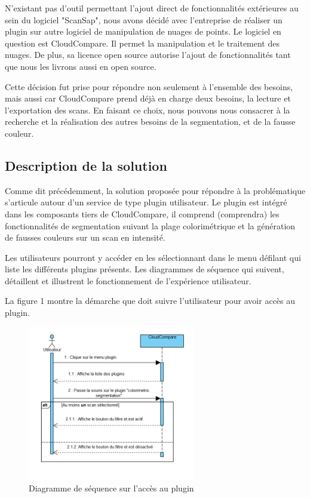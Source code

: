 \documentclass[12pt,titlepage,french]{article}
\begin{document}
N'existant pas d'outil permettant l'ajout direct de fonctionnalités extérieures au sein du logiciel "ScanSap", nous avons décidé avec l'entreprise de réaliser un plugin sur autre logiciel de manipulation de nuages de points. Le logiciel en question est CloudCompare. Il permet la manipulation et le traitement des nuages. De plus, sa licence open source autorise l'ajout de fonctionnalités tant que nous les livrons aussi en open source. \newline

Cette décision fut prise pour répondre non seulement à l'ensemble des besoins, mais aussi car CloudCompare prend déjà en charge deux besoins, la lecture et l'exportation des scans. En faisant ce choix, nous pouvons nous consacrer à la recherche et la réalisation des autres besoins de la segmentation, et de la fausse couleur.

\subsection{Description de la solution}

Comme dit précédemment, la solution proposée pour répondre à la problématique s'articule autour d'un service de type plugin utilisateur. Le plugin est intégré dans les composants tiers de CloudCompare, il comprend (comprendra) les fonctionnalités de segmentation suivant la plage colorimétrique et la génération de fausses couleurs sur un scan en intensité. \newline

Les utilisateurs pourront y accéder en les sélectionnant dans le menu défilant qui liste les différents plugins présents. Les diagrammes de séquence qui suivent, détaillent et illustrent le fonctionnement de l'expérience utilisateur. \newline

La figure 1 montre la démarche que doit suivre l'utilisateur pour avoir accès au plugin.

\begin{figure}[H]
\center
\includegraphics[width=0.65\textwidth]{./img/sequDiagPlugin.PNG}
    \caption{\label{} Diagramme de séquence sur l'accès au plugin}
\end{figure}
\end{document}
